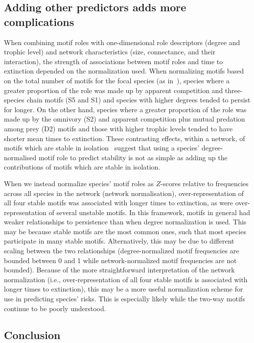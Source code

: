 \documentclass[12pt]{article}
\begin{document}
	\subsection*{Adding other predictors adds more complications}

		When combining motif roles with one-dimensional role descriptors (degree and trophic level) and network characteristics (size, connectance, and their interaction), the strength of associations between motif roles and time to extinction depended on the normalization used.
		When normalizing motifs based on the total number of motifs for the focal species (as in~\citet{Stouffer2012,Cirtwill2015}), species where a greater proportion of the role was made up by apparent competition and three-species chain motifs (S5 and S1) and species with higher degrees tended to persist for longer.
		On the other hand, species where a greater proportion of the role was made up by the omnivory (S2) and apparent competition plus mutual predation among prey (D2) motifs and those with higher trophic levels tended to have shorter mean times to extinction.
		These contrasting effects, within a network, of motifs which are stable in isolation~\citep{Borrelli2015a} suggest that using a species' degree-normalised motif role to predict stability is not as simple as adding up the contributions of motifs which are stable in isolation.


		When we instead normalize species' motif roles as $Z$-scores relative to frequencies across all species in the network (network normalisation), over-representation of all four stable motifs was associated with longer times to extinction, as were over-representation of several unstable motifs.
		In this framework, motifs in general had weaker relationships to persistence than when degree normalization is used. 
		This may be because stable motifs are the most common ones, such that most species participate in many stable motifs.
		Alternatively, this may be due to different scaling between the two relationships (degree-normalized motif frequencies are bounded between 0 and 1 while network-normalized motif frequencies are not bounded).
		Because of the more straightforward interpretation of the network normalization (i.e., over-representation of all four stable motifs is associated with longer times to extinction), this may be a more useful normalization scheme for use in predicting species' risks.
		This is especially likely while the two-way motifs continue to be poorly understood.

	
	\subsection*{Conclusion}	
\end{document}
